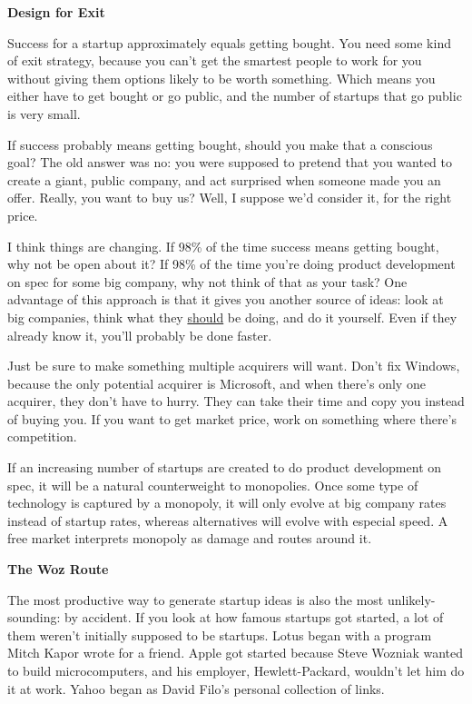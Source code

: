 \textbf{Design for Exit}

Success for a startup approximately equals getting bought. You need some
kind of exit strategy, because you can't get the smartest people to work
for you without giving them options likely to be worth something. Which
means you either have to get bought or go public, and the number of
startups that go public is very small.

If success probably means getting bought, should you make that a
conscious goal? The old answer was no: you were supposed to pretend that
you wanted to create a giant, public company, and act surprised when
someone made you an offer. Really, you want to buy us? Well, I suppose
we'd consider it, for the right price.

I think things are changing. If 98\% of the time success means getting
bought, why not be open about it? If 98\% of the time you're doing
product development on spec for some big company, why not think of that
as your task? One advantage of this approach is that it gives you
another source of ideas: look at big companies, think what they
\href{http://kiko.com}{should} be doing, and do it yourself. Even if
they already know it, you'll probably be done faster.

Just be sure to make something multiple acquirers will want. Don't fix
Windows, because the only potential acquirer is Microsoft, and when
there's only one acquirer, they don't have to hurry. They can take their
time and copy you instead of buying you. If you want to get market
price, work on something where there's competition.

If an increasing number of startups are created to do product
development on spec, it will be a natural counterweight to monopolies.
Once some type of technology is captured by a monopoly, it will only
evolve at big company rates instead of startup rates, whereas
alternatives will evolve with especial speed. A free market interprets
monopoly as damage and routes around it.

\textbf{The Woz Route}

The most productive way to generate startup ideas is also the most
unlikely-sounding: by accident. If you look at how famous startups got
started, a lot of them weren't initially supposed to be startups. Lotus
began with a program Mitch Kapor wrote for a friend. Apple got started
because Steve Wozniak wanted to build microcomputers, and his employer,
Hewlett-Packard, wouldn't let him do it at work. Yahoo began as David
Filo's personal collection of links.

